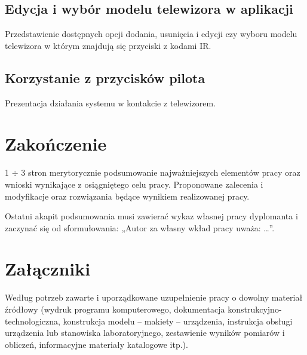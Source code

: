 \documentclass[12pt,twoside]{article}
\begin{document}
\subsection{Edycja i wybór modelu telewizora w aplikacji}
Przedstawienie dostępnych opcji dodania, usunięcia i edycji czy wyboru modelu telewizora w którym znajdują się przyciski z kodami IR.
\subsection{Korzystanie z przycisków pilota}
Prezentacja działania systemu w kontakcie z telewizorem.

\clearpage

\section{Zakończenie}

1 $\div$ 3 stron merytorycznie podsumowanie najważniejszych elementów pracy oraz wnioski wynikające z osiągniętego celu pracy. Proponowane zalecenia i modyfikacje oraz rozwiązania będące wynikiem realizowanej pracy.

Ostatni akapit podsumowania musi zawierać wykaz własnej pracy dyplomanta i zaczynać się od sformułowania: „Autor za własny wkład pracy uważa: \ldots”.

\clearpage

\section*{Załączniki}

Według potrzeb zawarte i uporządkowane uzupełnienie pracy o dowolny materiał źródłowy (wydruk programu komputerowego, dokumentacja kons\-truk\-cyj\-no-\-tech\-no\-lo\-gicz\-na, konstrukcja modelu -- makiety -- urządzenia, instrukcja obsługi urządzenia lub stanowiska laboratoryjnego, zestawienie wyników pomiarów i obliczeń, informacyjne materiały katalogowe itp.).


\clearpage




\clearpage

\makesummary
\end{document}
